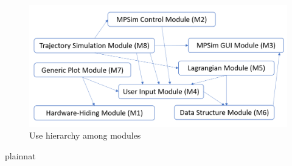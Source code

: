 \documentclass[12pt, titlepage]{article}
\begin{document}
\begin{figure}[H]
\centering
\includegraphics[width=1.0\textwidth]{usehiearchy.PNG}
\caption{Use hierarchy among modules}
\label{FigUH}
\end{figure}

\newpage

 {plainnat}

\end{document}
